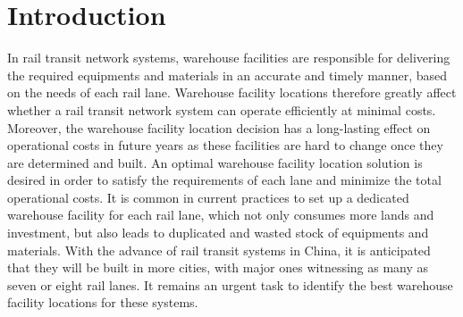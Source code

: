 \section{Introduction}
In rail transit network systems, warehouse facilities are responsible for delivering the required equipments and materials in an accurate and timely manner, based on the needs of each rail lane.
Warehouse facility locations therefore greatly affect whether a rail transit network system can operate efficiently at minimal costs.
Moreover, the warehouse facility location decision has a long-lasting effect on operational costs in future years as these facilities are hard to change once they are determined and built.
An optimal warehouse facility location solution is desired in order to satisfy the requirements of each lane and minimize the total operational costs.
It is common in current practices to set up a dedicated warehouse facility for each rail lane, which not only consumes more lands and investment, but also leads to duplicated and wasted stock of equipments and materials.
With the advance of rail transit systems in China, it is anticipated that they will be built in more cities, with major ones witnessing as many as seven or eight rail lanes.
It remains an urgent task to identify the best warehouse facility locations for these systems.


